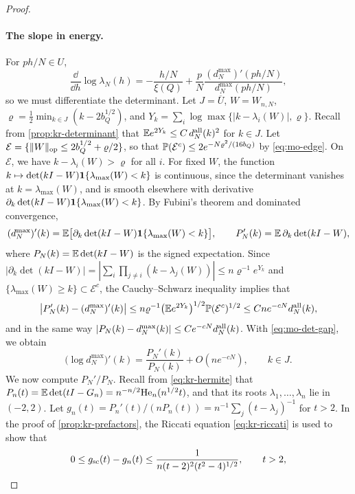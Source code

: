 \begin{proof}
\paragraph{The slope in energy.}
For $ph/N\in U$,
\begin{equation}\label{eq:mo-pure-slope}
\frac{\dd}{\dd h}\log\lambda_N(h)=-\frac{h/N}{\xi(Q)}+\frac pN\frac{(d_N^{\max})'(ph/N)}{d_N^{\max}(ph/N)},
\end{equation}
so we must differentiate the determinant. Let $J=\overline U$, $W=W_{n,N}$, $\varrho=\frac12\min_{k\in J}(k-2b_Q^{1/2})$, and $Y_k=\sum_i\log\max\{|k-\lambda_i(W)|,\varrho\}$. Recall from \cref{prop:kr-determinant} that $\mathbb E e^{2Y_k}\le C\,d_N^{\rm all}(k)^2$ for $k\in J$. Let $\mathcal E=\{\|W\|_{\rm op}\le2b_Q^{1/2}+\varrho/2\}$, so that $\mathbb P(\mathcal E^c)\le2e^{-N\varrho^2/(16b_Q)}$ by \eqref{eq:mo-edge}. On $\mathcal E$, we have $k-\lambda_i(W)>\varrho$ for all $i$. For fixed $W$, the function $k\mapsto\det(kI-W)\mathbf 1\{\lambda_{\max}(W)<k\}$ is continuous, since the determinant vanishes at $k=\lambda_{\max}(W)$, and is smooth elsewhere with derivative $\partial_k\det(kI-W)\mathbf 1\{\lambda_{\max}(W)<k\}$. By Fubini's theorem and dominated convergence,
\[
(d_N^{\max})'(k)=\mathbb E\bigl[\partial_k\det(kI-W)\mathbf 1\{\lambda_{\max}(W)<k\}\bigr],\qquad P_N'(k)=\mathbb E\,\partial_k\det(kI-W),
\]
where $P_N(k)=\mathbb E\det(kI-W)$ is the signed expectation. Since $|\partial_k\det(kI-W)|=|\sum_i\prod_{j\ne i}(k-\lambda_j(W))|\le n\varrho^{-1}e^{Y_k}$ and $\{\lambda_{\max}(W)\ge k\}\subset\mathcal E^c$, the Cauchy--Schwarz inequality implies that
\[
\bigl|P_N'(k)-(d_N^{\max})'(k)\bigr|\le n\varrho^{-1}\bigl(\mathbb E e^{2Y_k}\bigr)^{1/2}\mathbb P(\mathcal E^c)^{1/2}\le Cne^{-cN}d_N^{\rm all}(k),
\]
and in the same way $|P_N(k)-d_N^{\max}(k)|\le Ce^{-cN}d_N^{\rm all}(k)$. With \eqref{eq:mo-det-gap}, we obtain
\begin{equation}\label{eq:mo-logdet-derivative}
\bigl(\log d_N^{\max}\bigr)'(k)=\frac{P_N'(k)}{P_N(k)}+O(ne^{-cN}),\qquad k\in J.
\end{equation}
We now compute $P_N'/P_N$. Recall from \eqref{eq:kr-hermite} that $P_n(t)=\mathbb E\det(tI-G_n)=n^{-n/2}\mathrm{He}_n(n^{1/2}t)$, and that its roots $\lambda_1,\dots,\lambda_n$ lie in $(-2,2)$. Let $g_n(t)=P_n'(t)/(nP_n(t))=n^{-1}\sum_j(t-\lambda_j)^{-1}$ for $t>2$. In the proof of \cref{prop:kr-prefactors}, the Riccati equation \eqref{eq:kr-riccati} is used to show that
\begin{equation}\label{eq:mo-riccati}
0\le g_{\rm sc}(t)-g_n(t)\le\frac1{n(t-2)^2(t^2-4)^{1/2}},\qquad t>2,
\end{equation}

\end{proof}
